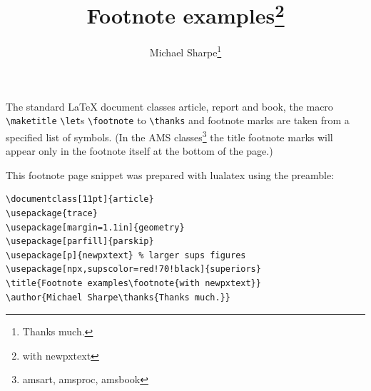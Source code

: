 \if1\zz\documentclass[11pt]{article}
\title{Footnote examples\footnote{with newpxtext}}
\author{Michael Sharpe\thanks{Thanks much.}}
\def\tt{\normalfont\ttfamily}
\begin{document}
\maketitle
\thispagestyle{empty}
%



The standard LaTeX document classes {\tt article}, {\tt report} and {\tt book}, the macro \verb|\maketitle| \verb|\let|s \verb|\footnote| to \verb|\thanks| and footnote marks are taken from a specified list of symbols. (In the AMS classes\footnote{amsart, amsproc, amsbook} the title footnote marks will appear only in the footnote itself at the bottom of the page.)\\

\centerline{
}
This footnote page snippet was prepared with {\tt lualatex} using the preamble:
\begin{verbatim}
\documentclass[11pt]{article}  
\usepackage{trace}
\usepackage[margin=1.1in]{geometry}
\usepackage[parfill]{parskip}
\usepackage[p]{newpxtext} % larger sups figures
\usepackage[npx,supscolor=red!70!black]{superiors}
\title{Footnote examples\footnote{with newpxtext}}
\author{Michael Sharpe\thanks{Thanks much.}}
\end{verbatim}


 
\end{document}

